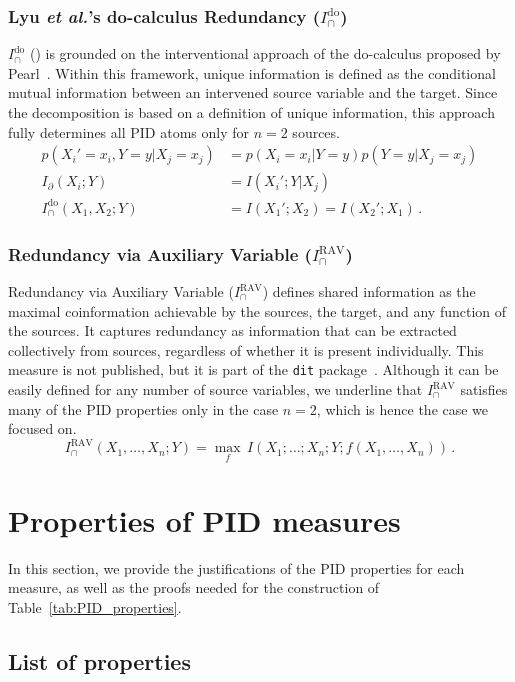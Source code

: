 \documentclass{article}
\makeatletter
\newcommand{\etalx}{\textit{et al.\@}\xspace}
\newcommand{\Xs}{X_1,\ldots,X_n}
\newcommand{\Ido}{\ensuremath{I_\cap^{\text{do}}}\xspace}
\newcommand{\IRAV}{\ensuremath{I_\cap^{\text{RAV}}}\xspace}
\makeatother
\begin{document}
\subsubsection*{Lyu \etalx's do-calculus Redundancy ($\Ido$)}
$\Ido$ (\cite{lyu2024explicit}) is grounded on the interventional approach of the do-calculus proposed by Pearl~\cite{pearl1995causal, pearl2009causal, pearl2009causality}. Within this framework, unique information is defined as the conditional mutual information between an intervened source variable and the target. Since the decomposition is based on a definition of unique information, this approach fully determines all PID atoms only for $n=2$ sources.
\begin{align} \label{eq:DO-def}
    p(X_i'=x_i,Y=y|X_j=x_j) & = p(X_i=x_i|Y=y)p(Y=y|X_j=x_j) \\
    I_\partial(X_i;Y) & = I(X_i';Y|X_j) \\
    \Ido(X_1,X_2;Y) & = I(X_1';X_2)= I(X_2';X_1) \,. \label{eq:DO-def2}
\end{align}

\subsubsection*{Redundancy via Auxiliary Variable ($\IRAV$)}
Redundancy via Auxiliary Variable ($\IRAV$) defines shared information as the maximal coinformation achievable by the sources, the target, and any function of the sources. It captures redundancy as information that can be extracted collectively from sources, regardless of whether it is present individually. This measure is not published, but it is part of the \texttt{dit} package~\cite{james2018dit}. Although it can be easily defined for any number of source variables, we underline that \IRAV satisfies many of the PID properties only in the case $n=2$, which is hence the case we focused on.
\begin{equation}
    I^\text{RAV}_\cap(\Xs;Y) = \max_f \,I(X_1;\ldots;X_n;Y;f(\Xs)) \,.
\end{equation}


\section{Properties of PID measures}
In this section, we provide the justifications of the PID properties for each measure, as well as the proofs needed for the construction of Table~\ref{tab:PID_properties}.

\subsection{List of properties}
\end{document}
